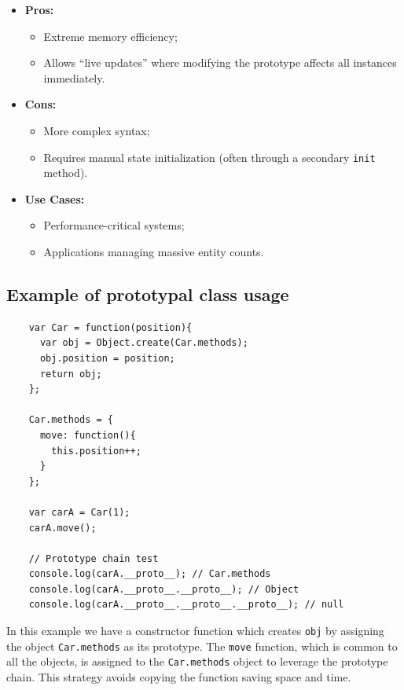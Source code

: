 \documentclass{scrbook}
\begin{document}
\begin{itemize}
    \item
        \textbf{Pros:}
        \begin{itemize}
            \item Extreme memory efficiency;
            \item Allows ``live updates'' where modifying the prototype affects all instances immediately.
        \end{itemize}
        
    \item
        \textbf{Cons:}
        \begin{itemize}
            \item More complex syntax;
            \item Requires manual state initialization (often through a secondary \texttt{init} method).
        \end{itemize}
    
    \item
        \textbf{Use Cases:}
        \begin{itemize}
            \item Performance-critical systems;
            \item Applications managing massive entity counts.
        \end{itemize}
\end{itemize}

\subsection{Example of prototypal class usage}

\begin{lstlisting}
    var Car = function(position){
      var obj = Object.create(Car.methods);
      obj.position = position;
      return obj;
    };
    
    Car.methods = {
      move: function(){
        this.position++;
      }
    };
    
    var carA = Car(1);
    carA.move();

    // Prototype chain test
    console.log(carA.__proto__); // Car.methods
    console.log(carA.__proto__.__proto__); // Object
    console.log(carA.__proto__.__proto__.__proto__); // null
\end{lstlisting}

In this example we have a constructor function which creates \texttt{obj} by assigning the object \texttt{Car.methods} as its prototype. The \texttt{move} function, which is common to all the objects, is assigned to the \texttt{Car.methods} object to leverage the prototype chain. This strategy avoids copying the function saving space and time.\\
\end{document}
